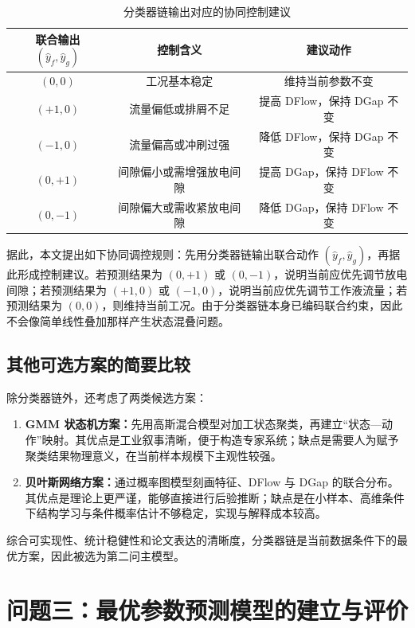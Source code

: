 \documentclass[UTF8,a4paper,12pt]{ctexart}
\begin{document}
\begin{table}[H]
\centering
\caption{分类器链输出对应的协同控制建议}
\label{tab:control_rule}
\begin{tabular}{ccc}
\toprule
联合输出 $(\hat y_f,\hat y_g)$ & 控制含义 & 建议动作 \\
\midrule
$(0,0)$ & 工况基本稳定 & 维持当前参数不变 \\
$(+1,0)$ & 流量偏低或排屑不足 & 提高 DFlow，保持 DGap 不变 \\
$(-1,0)$ & 流量偏高或冲刷过强 & 降低 DFlow，保持 DGap 不变 \\
$(0,+1)$ & 间隙偏小或需增强放电间隙 & 提高 DGap，保持 DFlow 不变 \\
$(0,-1)$ & 间隙偏大或需收紧放电间隙 & 降低 DGap，保持 DFlow 不变 \\
\bottomrule
\end{tabular}
\end{table}

据此，本文提出如下协同调控规则：先用分类器链输出联合动作 $(\hat y_f,\hat y_g)$，再据此形成控制建议。若预测结果为 $(0,+1)$ 或 $(0,-1)$，说明当前应优先调节放电间隙；若预测结果为 $(+1,0)$ 或 $(-1,0)$，说明当前应优先调节工作液流量；若预测结果为 $(0,0)$，则维持当前工况。由于分类器链本身已编码联合约束，因此不会像简单线性叠加那样产生状态混叠问题。

\subsection{其他可选方案的简要比较}

除分类器链外，还考虑了两类候选方案：
\begin{enumerate}[label=(\arabic*),leftmargin=2em]
\item \textbf{GMM 状态机方案：}先用高斯混合模型对加工状态聚类，再建立“状态—动作”映射。其优点是工业叙事清晰，便于构造专家系统；缺点是需要人为赋予聚类结果物理意义，在当前样本规模下主观性较强。
\item \textbf{贝叶斯网络方案：}通过概率图模型刻画特征、DFlow 与 DGap 的联合分布。其优点是理论上更严谨，能够直接进行后验推断；缺点是在小样本、高维条件下结构学习与条件概率估计不够稳定，实现与解释成本较高。
\end{enumerate}

综合可实现性、统计稳健性和论文表达的清晰度，分类器链是当前数据条件下的最优方案，因此被选为第二问主模型。

\section{问题三：最优参数预测模型的建立与评价}
\label{sec:model}
\end{document}
